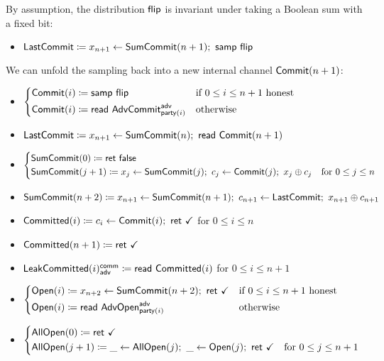 \noindent By assumption, the distribution $\mathsf{flip}$ is invariant under taking a Boolean sum with a fixed bit:

\begin{itemize}
\item $\mathsf{LastCommit} \coloneqq x_{n+1} \leftarrow \mathsf{SumCommit}(n+1); \ \mathsf{samp} \ \mathsf{flip}$
\end{itemize}

\noindent We can unfold the sampling back into a new internal channel $\mathsf{Commit}(n+1)$:

\begin{itemize}
\item {\color{blue} $\begin{cases*} \Commit(i) \coloneqq \samp{\flip} & \text{if $0 \leq i \leq n+1$ honest} \\ \Commit(i) \coloneqq \read{\AdvCommit^\adv_{\party(i)}} & \text{otherwise} \end{cases*}$}
\item {\color{blue} $\mathsf{LastCommit} \coloneqq x_{n+1} \leftarrow \mathsf{SumCommit}(n); \ \mathsf{read} \ \mathsf{Commit}(n+1)$}
\item {\color{blue} $\begin{cases*} \SumCommit(0) \coloneqq \ret{\false} & \\ \SumCommit(j+1) \coloneqq x_j \leftarrow \SumCommit(j); \ c_j \leftarrow \Commit(j); \ x_j \oplus c_j & \text{for $0 \leq j \leq n$} \end{cases*}$}
\item {\color{blue} $\SumCommit(n+2) \coloneqq x_{n+1} \leftarrow \SumCommit(n+1); \ c_{n+1} \leftarrow \LastCommit; \ x_{n+1} \oplus c_{n+1}$}
\item {\color{magenta} $\mathsf{Committed}(i) \coloneqq c_i \leftarrow \mathsf{Commit}(i); \ \mathsf{ret} \ \checkmark$ for $0 \leq i \leq n$}
\item {\color{magenta} $\mathsf{Committed}(n+1) \coloneqq \mathsf{ret} \ \checkmark$}
\item {\color{magenta} $\mathsf{LeakCommitted}(i)^{\mathsf{comm}}_{\mathsf{adv}} \coloneqq \mathsf{read} \ \mathsf{Committed}(i)$ for $0 \leq i \leq n+1$}
\item {\color{teal} $\begin{cases*} \Open(i) \coloneqq x_{n+2} \leftarrow \SumCommit(n+2); \ \ret{\checkmark} & \text{if $0 \leq i \leq n+1$ honest} \\ \Open(i) \coloneqq \read{\AdvOpen^\adv_{\party(i)}} & \text{otherwise} \end{cases*}$}
\item {\color{teal} $\begin{cases*} \AllOpen(0) \coloneqq \ret{\checkmark} & \\ \AllOpen(j+1) \coloneqq \_ \leftarrow \AllOpen(j); \ \_ \leftarrow \Open(j); \ \ret{\checkmark} & \text{for $0 \leq j \leq n+1$} \end{cases*}$}

\end{itemize}
